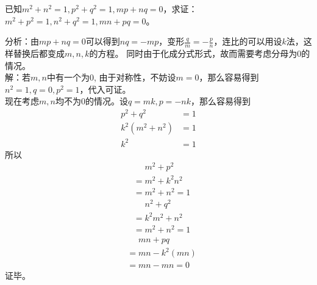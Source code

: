 \documentclass[windows,csize4,answers]{BHCexam}
\begin{document}
\begin{groups}
\begin{questions}[]
        \question[5]  已知$m^2+n^2=1, p^2+q^2=1, mp+nq=0$，求证：$m^2+p^2=1,n^2+q^2=1,mn+pq=0$。
        \begin{solution}{0.5cm}
            \methodonly 分析：由$mp+nq=0$可以得到$nq=-mp$，变形$\frac{q}{m}=-\frac{p}{n}$，连比的可以用设$k$法，这样替换后都变成$m,n,k$的方程。
            同时由于化成分式形式，故而需要考虑分母为$0$的情况。\\ 
            解：若$m,n$中有一个为$0$, 由于对称性，不妨设$m=0$，那么容易得到$n^2=1, q=0, p^2=1$，代入可证。\\ 
            现在考虑$m,n$均不为$0$的情况。设$q=mk, p=-nk$，那么容易得到
            \[
                \begin{aligned}
                    p^2+q^2&=1 \\
                    k^2(m^2+n^2)&=1 \\
                    k^2&=1
                \end{aligned}
            \]
            所以
            \[
                \begin{aligned}
                    &\phantom{=}m^2+p^2 \\
                    &=m^2+k^2n^2 \\
                    &=m^2+n^2=1 
                \end{aligned}
            \]
            \[
                \begin{aligned}
                    &\phantom{=}n^2+q^2 \\
                    &=k^2m^2+n^2 \\
                    &=m^2+n^2=1 
                \end{aligned}
            \]
            \[
                \begin{aligned}
                    &\phantom{=}mn+pq \\
                    &=mn-k^2(mn) \\
                    &=mn-mn=0 
                \end{aligned}
            \]
            证毕。

        \end{solution}
        \vspace{3.5cm}


\end{questions}
\end{groups}
\end{document}
